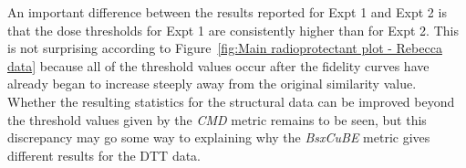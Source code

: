 An important difference between the results reported for Expt 1 and Expt 2 is that the dose thresholds for Expt 1 are consistently higher than for Expt 2.
This is not surprising according to Figure~\ref{fig:Main radioprotectant plot - Rebecca data} because all of the threshold values occur after the fidelity curves have already began to increase steeply away from the original similarity value.
Whether the resulting statistics for the structural data can be improved beyond the threshold values given by the \textit{CMD} metric remains to be seen, but this discrepancy may go some way to explaining why the \textit{BsxCuBE} metric gives different results for the DTT data.
